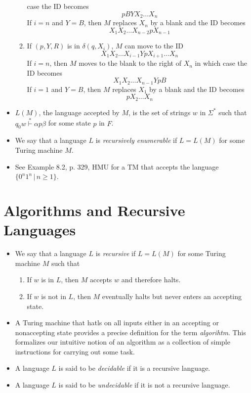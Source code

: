 \documentclass[]{article}
\begin{document}
\begin{itemize}
\begin{enumerate}
        case the ID becomes 
          \[ pBYX_2\ldots{}X_n \]
        If $i = n$ and $Y = B$, then $M$ replaces $X_n$ by a blank and the ID 
        becomes
          \[ X_1X_2\ldots{}X_{n-2}pX_{n-1} \]
        \item If $(p, Y, R)$ is in $\delta(q, X_i)$, $M$ can move to the ID
          \[ X_1X_2\ldots{}X_{i - 1}YpX_{i + 1}\ldots{}X_n \]
        If $i = n$, then $M$ moves to the blank to the right of $X_n$ in which
        case the ID becomes
          \[ X_1X_2\ldots{}X_{n - 1}YpB \]
        If $i = 1$ and $Y = B$, then $M$ replaces $X_1$ by a blank and the ID 
        becomes
          \[ pX_2\ldots{}X_n \]
      \end{enumerate}
    \item $L(M)$, the language accepted by $M$, is the set of strings $w$ in 
    $\Sigma^*$ such that $q_0w\overset{*}{\vdash} \alpha{p}\beta$ for some 
    state $p$ in $F$.
    \item We say that a language $L$ is \emph{recursively enumerable} if 
    $L = L(M)$ for some Turing machine $M$.
    \item See Example 8.2, p. 329, HMU for a TM that accepts the language
    $\{0^n1^n \, | \, n \geq 1 \}$.
  \end{itemize}

\section{Algorithms and Recursive Languages}
  \begin{itemize}
    \item We say that a language $L$ is \emph{recursive} if $L = L(M)$ for some 
    Turing machine $M$ such that
      \begin{enumerate}
        \item If $w$ is in $L$, then $M$ accepts $w$ and therefore halts.
        \item If $w$ is not in $L$, then $M$ eventually halts but never enters 
        an accepting state.
      \end{enumerate}
    \item A Turing machine that hatls on all inputs either in an accepting or 
    nonaccepting state provides a precise definition for the term 
    \emph{algorihtm}. This formalizes our intuitive notion of an algorithm as a 
    collection of simple instructions for carrying out some task.
    \item A language $L$ is said to be \emph{decidable} if it is a recursive 
    language.
    \item A language $L$ is said to be \emph{undecidable} if it is not a 
    recursive language.
  \end{itemize}
\end{document}
